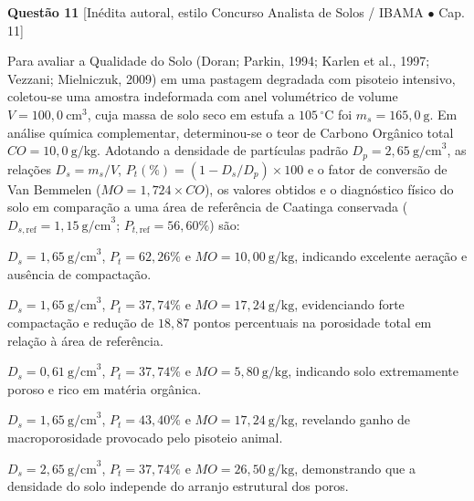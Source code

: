 \vspace{6pt}
\noindent\textbf{Questão 11} {\footnotesize\color{uefsMuted}[Inédita autoral, estilo Concurso Analista de Solos / IBAMA $\bullet$ Cap. 11]}\par
Para avaliar a Qualidade do Solo (Doran; Parkin, 1994; Karlen et al., 1997; Vezzani; Mielniczuk, 2009) em uma pastagem degradada com pisoteio intensivo, coletou-se uma amostra indeformada com anel volumétrico de volume $V = 100,0\ \text{cm}^3$, cuja massa de solo seco em estufa a $105\,^\circ\text{C}$ foi $m_s = 165,0\ \text{g}$. Em análise química complementar, determinou-se o teor de Carbono Orgânico total $CO = 10,0\ \text{g/kg}$. Adotando a densidade de partículas padrão $D_p = 2,65\ \text{g/cm}^3$, as relações $D_s = m_s / V$, $P_t(\%) = (1 - D_s / D_p)\times 100$ e o fator de conversão de Van Bemmelen ($MO = 1,724 \times CO$), os valores obtidos e o diagnóstico físico do solo em comparação a uma área de referência de Caatinga conservada ($D_{s,\text{ref}} = 1,15\ \text{g/cm}^3$; $P_{t,\text{ref}} = 56,60\%$) são:
\begin{alternativas}
  \item $D_s = 1,65\ \text{g/cm}^3$, $P_t = 62,26\%$ e $MO = 10,00\ \text{g/kg}$, indicando excelente aeração e ausência de compactação.
  \item $D_s = 1,65\ \text{g/cm}^3$, $P_t = 37,74\%$ e $MO = 17,24\ \text{g/kg}$, evidenciando forte compactação e redução de $18,87$ pontos percentuais na porosidade total em relação à área de referência.
  \item $D_s = 0,61\ \text{g/cm}^3$, $P_t = 37,74\%$ e $MO = 5,80\ \text{g/kg}$, indicando solo extremamente poroso e rico em matéria orgânica.
  \item $D_s = 1,65\ \text{g/cm}^3$, $P_t = 43,40\%$ e $MO = 17,24\ \text{g/kg}$, revelando ganho de macroporosidade provocado pelo pisoteio animal.
  \item $D_s = 2,65\ \text{g/cm}^3$, $P_t = 37,74\%$ e $MO = 26,50\ \text{g/kg}$, demonstrando que a densidade do solo independe do arranjo estrutural dos poros.
\end{alternativas}

